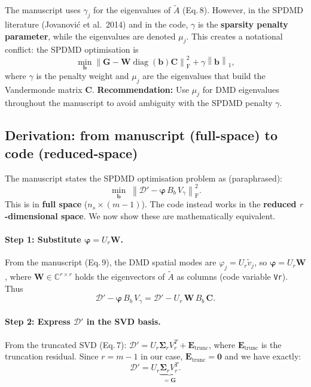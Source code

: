 \documentclass[11pt,a4paper]{article}
\newcommand{\norm}[1]{\left\lVert #1 \right\rVert}
\newcommand{\Fro}{\mathrm{F}}
\newcommand{\diag}{\operatorname{diag}}
\newcommand{\Sigmat}{\bm{\Sigma}}
\begin{document}
The manuscript uses $\gamma_j$ for the eigenvalues of $\tilde{A}$ (Eq.\,8).  However, in the SPDMD literature (Jovanovi\'c et al.\ 2014) and in the code, $\gamma$ is the \textbf{sparsity penalty parameter}, while the eigenvalues are denoted $\mu_j$.  This creates a notational conflict: the SPDMD optimisation is
\[
\min_{\bm{b}} \norm{\bm{G} - \bm{W}\diag(\bm{b})\bm{C}}_\Fro^2 + \gamma \norm{\bm{b}}_1,
\]
where $\gamma$ is the penalty weight and $\mu_j$ are the eigenvalues that build the Vandermonde matrix $\bm{C}$.  \textbf{Recommendation:} Use $\mu_j$ for DMD eigenvalues throughout the manuscript to avoid ambiguity with the SPDMD penalty $\gamma$.

\subsection{Derivation: from manuscript (full-space) to code (reduced-space)}
\label{sec:derivation}

The manuscript states the SPDMD optimisation problem as (paraphrased):
\begin{equation}\label{eq:full_space}
\min_{\bm{b}} \;\norm{\mathcal{D}' - \bm{\varphi}\, B_b\, V_\gamma}_\Fro^2.
\end{equation}
This is in \textbf{full space} ($n_s \times (m{-}1)$).  The code instead works in the \textbf{reduced $r$-dimensional space}.  We now show these are mathematically equivalent.

\paragraph{Step 1: Substitute $\bm{\varphi} = U_r \bm{W}$.}

From the manuscript (Eq.\,9), the DMD spatial modes are $\varphi_j = U_r \tilde{v}_j$, so $\bm{\varphi} = U_r \bm{W}$, where $\bm{W} \in \mathbb{C}^{r \times r}$ holds the eigenvectors of $\tilde{A}$ as columns (code variable \texttt{Vr}).  Thus
\begin{equation}
\mathcal{D}' - \bm{\varphi}\, B_b\, V_\gamma = \mathcal{D}' - U_r\, \bm{W}\, B_b\, \bm{C}.
\end{equation}

\paragraph{Step 2: Express $\mathcal{D}'$ in the SVD basis.}

From the truncated SVD (Eq.\,7): $\mathcal{D}' = U_r \Sigmat_r V_r^T + \bm{E}_{\mathrm{trunc}}$, where $\bm{E}_{\mathrm{trunc}}$ is the truncation residual.  Since $r = m{-}1$ in our case, $\bm{E}_{\mathrm{trunc}} = \bm{0}$ and we have exactly:
\begin{equation}
\mathcal{D}' = U_r \underbrace{\Sigmat_r V_r^T}_{\displaystyle = \bm{G}}.
\end{equation}
\end{document}
